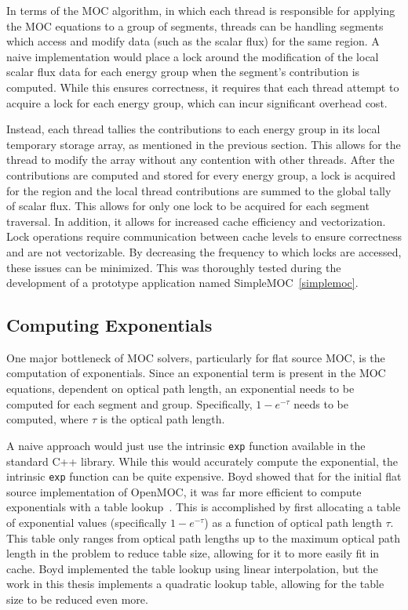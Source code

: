 In terms of the \ac{MOC} algorithm, in which each thread is responsible for applying the \ac{MOC} equations to a group of segments, threads can be handling segments which access and modify data (such as the scalar flux) for the same region. A naive implementation would place a lock around the modification of the local scalar flux data for each energy group when the segment's contribution is computed. While this ensures correctness, it requires that each thread attempt to acquire a lock for each energy group, which can incur significant overhead cost.

Instead, each thread tallies the contributions to each energy group in its local temporary storage array, as mentioned in the previous section. This allows for the thread to modify the array without any contention with other threads. After the contributions are computed and stored for every energy group, a lock is acquired for the region and the local thread contributions are summed to the global tally of scalar flux. This allows for only one lock to be acquired for each segment traversal. In addition, it allows for increased cache efficiency and vectorization. Lock operations require communication between cache levels to ensure correctness and are not vectorizable. By decreasing the frequency to which locks are accessed, these issues can be minimized. This was thoroughly tested during the development of a prototype application named SimpleMOC~\ref{simplemoc}.

\subsection{Computing Exponentials}

One major bottleneck of \ac{MOC} solvers, particularly for flat source \ac{MOC}, is the computation of exponentials. Since an exponential term is present in the \ac{MOC} equations, dependent on optical path length, an exponential needs to be computed for each segment and group. Specifically, $1-e^{-\tau}$ needs to be computed, where $\tau$ is the optical path length. 

A naive approach would just use the intrinsic \texttt{exp} function available in the standard C++ library. While this would accurately compute the exponential, the intrinsic \texttt{exp} function can be quite expensive. Boyd showed that for the initial flat source implementation of OpenMOC, it was far more efficient to compute exponentials with a table lookup~\cite{boyd2014openmoc}. This is accomplished by first allocating a table of exponential values (specifically $1-e^{-\tau}$) as a function of optical path length $\tau$. This table only ranges from optical path lengths up to the maximum optical path length in the problem to reduce table size, allowing for it to more easily fit in cache. Boyd implemented the table lookup using linear interpolation, but the work in this thesis implements a quadratic lookup table, allowing for the table size to be reduced even more.

